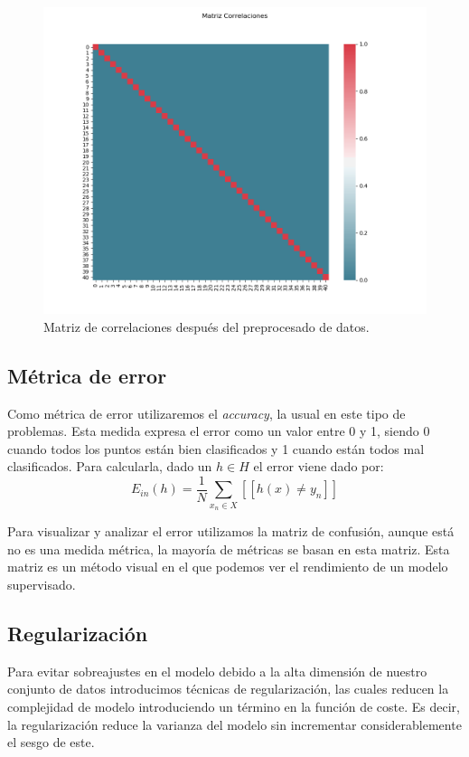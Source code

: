 \documentclass[size=a4, parskip=half, titlepage=false, toc=flat, toc=bib, 12pt]{scrartcl}
\begin{document}
\begin{figure}[H]
\centering
\includegraphics[width=1\textwidth]{./img/despuespre}
\caption{Matriz de correlaciones después del preprocesado de datos.}
\end{figure}

\subsection{Métrica de error}

Como métrica de error utilizaremos el \textit{accuracy}, la usual en este tipo de problemas. Esta medida expresa el error como un valor entre 0 y 1, siendo 0 cuando todos los puntos están bien clasificados y 1 cuando están todos mal clasificados. Para calcularla, dado un $h \in H$ el error viene dado por:
$$E_{in}(h) = \frac{1}{N} \sum_{x_n \in X} [[ h(x) \neq y_n]] $$

Para visualizar y analizar el error utilizamos la matriz de confusión, aunque está no es una medida métrica, la mayoría de métricas se basan en esta matriz. Esta matriz es un método visual en el que podemos ver el rendimiento de un modelo supervisado.

\subsection{Regularización}

Para evitar sobreajustes en el modelo debido a la alta dimensión de nuestro conjunto de datos introducimos técnicas de regularización, las cuales reducen la complejidad de modelo introduciendo un término en la función de coste. Es decir, la regularización reduce la varianza del modelo sin incrementar considerablemente el sesgo de este.
\end{document}
